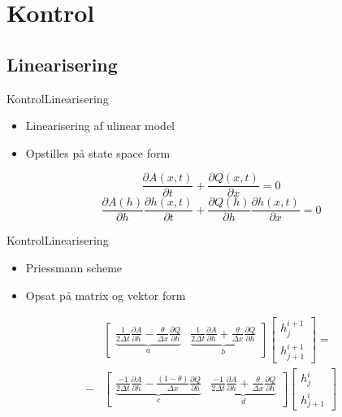 \section{Kontrol}
\subsection{Linearisering}
\begin{frame}{Kontrol}{Linearisering}
 \vfill\vfill\centering    
\begin{itemize}
	\item Linearisering af ulinear model
	\item Opstilles på state space form

\end{itemize}
\begin{equation}\label{eq:linearization_Continuity}
\frac{\partial A(x,t)}{\partial t} + \frac{\partial Q(x,t)}{\partial x}=0
\end{equation}
\begin{equation}
	\frac{\partial A(h)}{\partial h}\frac{\partial h(x,t)}{\partial t} + \frac{\partial Q(h)}{\partial h}\frac{\partial h(x,t)}{\partial x}=0
\end{equation}
\vfill\vfill
\end{frame}

\begin{frame}{Kontrol}{Linearisering}
 \vfill\vfill\centering    
\begin{itemize}
	\item Priessmann scheme
	\item Opsat på matrix og vektor form

\end{itemize}
\begin{equation}\label{eq:rearrange_continuity_eq}
\begin{aligned}
	&\begin{bmatrix}
		\underbrace{\frac{1}{2\Delta t}\frac{\partial A}{\partial h}-\frac{\theta}{\Delta x}\frac{\partial Q}{\partial h}}_{a} & \underbrace{\frac{1}{2\Delta t}\frac{\partial A}{\partial h}+\frac{\theta}{\Delta x}\frac{\partial Q}{\partial h}}_{b} 
	\end{bmatrix}
	\begin{bmatrix}
		h_{j}^{i+1} \\
		h_{j+1}^{i+1}
	\end{bmatrix}
	= \\ -
	&\begin{bmatrix}
		\underbrace{\frac{-1}{2\Delta t}\frac{\partial A}{\partial h}-\frac{(1-\theta)}{\Delta x}\frac{\partial Q}{\partial h}}_{c} & \underbrace{\frac{-1}{2\Delta t}\frac{\partial A}{\partial h}+\frac{\theta}{\Delta x}\frac{\partial Q}{\partial h}}_{d} 
	\end{bmatrix}
	\begin{bmatrix}
		h_{j}^{i} \\
		h_{j+1}^{i}
	\end{bmatrix}
	\end{aligned}
\end{equation}
\vfill\vfill
\end{frame}




